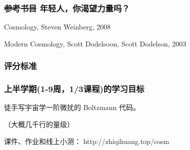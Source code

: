\documentclass[CJK,13pt]{beamer}
\date{}
\begin{document}
  \bch
{}


\begin{frame}
\frametitle{\sout{参考书目} 年轻人，你渴望力量吗？}
\bitem
\item{Cosmology, Steven Weinberg, 2008}
\item{Modern Cosmology, Scott Dodelsoon, Scott Dodelson, 2003}
\eitem
      
\end{frame}




\begin{frame}
\frametitle{评分标准}


\end{frame}


\begin{frame}
\frametitle{上半学期(1-9周，1/3课程)的学习目标}

徒手写宇宙学一阶微扰的 Boltzmann 代码。

（大概几千行的量级）

\skiplines

课件、作业和线上小测： http://zhiqihuang.top/cosm
\end{frame}



\ech
\end{document}
